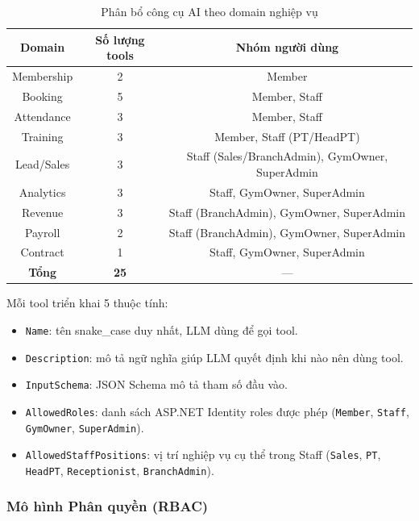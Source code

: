 \begin{table}[H]
\centering
\renewcommand{\arraystretch}{1.35}
\begin{tabular}{|c|c|c|}
\hline
\textbf{Domain} & \textbf{Số lượng tools} & \textbf{Nhóm người dùng} \\
\hline
Membership & 2 & Member \\
\hline
Booking & 5 & Member, Staff \\
\hline
Attendance & 3 & Member, Staff \\
\hline
Training & 3 & Member, Staff (PT/HeadPT) \\
\hline
Lead/Sales & 3 & Staff (Sales/BranchAdmin), GymOwner, SuperAdmin \\
\hline
Analytics & 3 & Staff, GymOwner, SuperAdmin \\
\hline
Revenue & 3 & Staff (BranchAdmin), GymOwner, SuperAdmin \\
\hline
Payroll & 2 & Staff (BranchAdmin), GymOwner, SuperAdmin \\
\hline
Contract & 1 & Staff, GymOwner, SuperAdmin \\
\hline
\textbf{Tổng} & \textbf{25} & --- \\
\hline
\end{tabular}
\caption{Phân bổ công cụ AI theo domain nghiệp vụ}
\label{tab:ai-tools}
\end{table}

Mỗi tool triển khai 5 thuộc tính:

\begin{itemize}
    \item \texttt{Name}: tên snake\_case duy nhất, LLM dùng để gọi tool.
    \item \texttt{Description}: mô tả ngữ nghĩa giúp LLM quyết định khi nào nên dùng tool.
    \item \texttt{InputSchema}: JSON Schema mô tả tham số đầu vào.
    \item \texttt{AllowedRoles}: danh sách ASP.NET Identity roles được phép (\texttt{Member}, \texttt{Staff}, \texttt{GymOwner}, \texttt{SuperAdmin}).
    \item \texttt{AllowedStaffPositions}: vị trí nghiệp vụ cụ thể trong Staff (\texttt{Sales}, \texttt{PT}, \texttt{HeadPT}, \texttt{Receptionist}, \texttt{BranchAdmin}).
\end{itemize}

\subsubsection{Mô hình Phân quyền (RBAC)}

